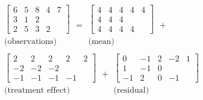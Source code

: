 \begin{enumerate}[label= (\alph*)]
    \begin{multline*}
        \begin{array}{c}
            \left[
                \begin{array}{ccccc}
                    6 & 5 & 8 & 4 & 7 \\
                    3 & 1 & 2 &   &   \\
                    2 & 5 & 3 & 2 & 
                \end{array}
            \right] \\
            \text{(observations)}
        \end{array}
        =
        \begin{array}{c}
            \left[
                \begin{array}{ccccc}
                    4 & 4 & 4 & 4 & 4 \\
                    4 & 4 & 4 &   &   \\
                    4 & 4 & 4 & 4 & 
                \end{array}
            \right] \\
            \text{(mean)}
        \end{array}
        +\\
        \begin{array}{c}
            \left[
                \begin{array}{rrrrr}
                    2 &  2 &  2 &  2 & 2 \\
                    -2 & -2 & -2 &    &   \\
                    -1 & -1 & -1 & -1 & 
                \end{array}
            \right] \\
            \text{(treatment effect)}
        \end{array}
        +
        \begin{array}{c}
            \left[
                \begin{array}{rrrrr}
                    0 & -1 & 2 & -2 & 1 \\
                    1 & -1 & 0 &    &   \\
                    -1 &  2 & 0 & -1 & 
                \end{array}
            \right] \\
            \text{(residual)}
        \end{array}
    \end{multline*}


\end{enumerate}
